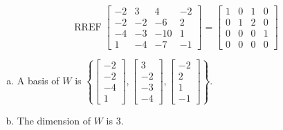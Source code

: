 \begin{exerciseAnswer} 


\[\operatorname{RREF} \left[\begin{array}{cccc}
-2 & 3 & 4 & -2 \\
-2 & -2 & -6 & 2 \\
-4 & -3 & -10 & 1 \\
1 & -4 & -7 & -1
\end{array}\right] = \left[\begin{array}{cccc}
1 & 0 & 1 & 0 \\
0 & 1 & 2 & 0 \\
0 & 0 & 0 & 1 \\
0 & 0 & 0 & 0
\end{array}\right] \]


\begin{enumerate}[(a)]
\item A basis of \(W\) is \( \left\{ \left[\begin{array}{c}
-2 \\
-2 \\
-4 \\
1
\end{array}\right] , \left[\begin{array}{c}
3 \\
-2 \\
-3 \\
-4
\end{array}\right] , \left[\begin{array}{c}
-2 \\
2 \\
1 \\
-1
\end{array}\right] \right\} \).
\item The dimension of \(W\) is \( 3 \).
\end{enumerate}
    
\end{exerciseAnswer}
    
